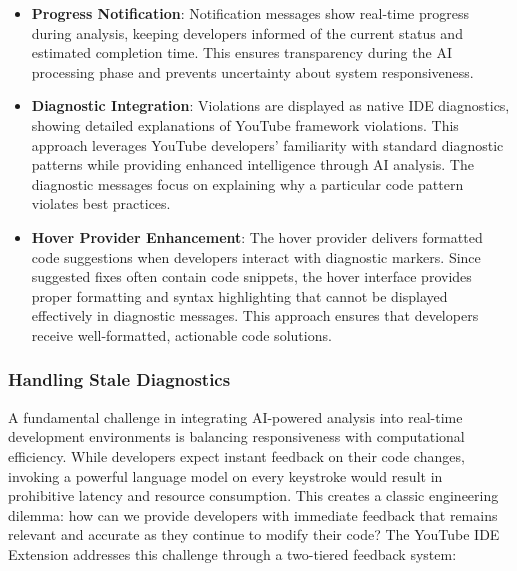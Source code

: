\begin{spacing}{1.2}
\begin{itemize}
    \item \textbf{Progress Notification}: Notification messages show real-time progress during analysis, keeping developers informed of the current status and estimated completion time. This ensures transparency during the AI processing phase and prevents uncertainty about system responsiveness.
    
    \item \textbf{Diagnostic Integration}: Violations are displayed as native IDE diagnostics, showing detailed explanations of YouTube framework violations. This approach leverages YouTube developers' familiarity with standard diagnostic patterns while providing enhanced intelligence through AI analysis. The diagnostic messages focus on explaining why a particular code pattern violates best practices.
    
    \item \textbf{Hover Provider Enhancement}: The hover provider delivers formatted code suggestions when developers interact with diagnostic markers. Since suggested fixes often contain code snippets, the hover interface provides proper formatting and syntax highlighting that cannot be displayed effectively in diagnostic messages. This approach ensures that developers receive well-formatted, actionable code solutions.
\end{itemize}


\subsubsection{Handling Stale Diagnostics}
A fundamental challenge in integrating AI-powered analysis into real-time development environments is balancing responsiveness with computational efficiency. While developers expect instant feedback on their code changes, invoking a powerful language model on every keystroke would result in prohibitive latency and resource consumption. This creates a classic engineering dilemma: how can we provide developers with immediate feedback that remains relevant and accurate as they continue to modify their code? The YouTube IDE Extension addresses this challenge through a two-tiered feedback system:


\end{spacing}

